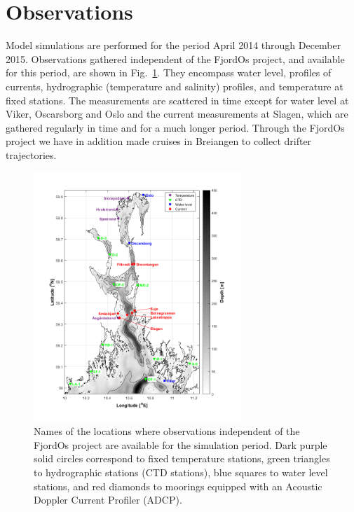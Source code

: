 \section{Observations}
\label{sec:obser}

Model simulations are performed for the period April 2014 through December 2015. Observations gathered independent of the FjordOs project, and available for this period, are shown in Fig.~\ref{fig:kart_obs}. They encompass water level, profiles of currents, hydrographic (temperature and salinity) profiles, and temperature at fixed stations. The measurements are scattered in time except for water level at Viker, Oscarsborg and Oslo and the current measurements at Slagen, which are gathered regularly in time and for a much longer period. Through the FjordOs project we have in addition made cruises in Breiangen to collect drifter trajectories.

\begin{figure}[htb]
\centerline{
\includegraphics*[trim=0cm 0.8cm 0cm 0cm,clip=true,width=0.7\textwidth]{Figurer/kart_obs}
}
\caption{\small Names of the locations where observations independent of the FjordOs project are available for the simulation period. Dark purple solid circles correspond to fixed temperature stations, green triangles to hydrographic stations (CTD stations), blue squares to water level stations, and red diamonds to moorings equipped with an Acoustic Doppler Current Profiler (ADCP).}
\label{fig:kart_obs}
\end{figure}

